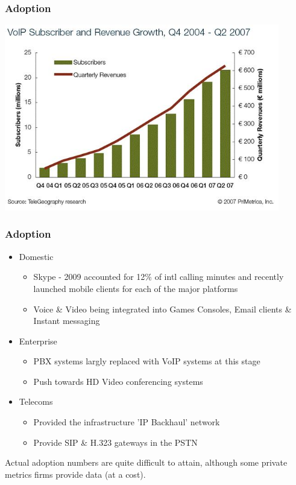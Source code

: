 \begin{frame}
\frametitle{Adoption}
	\begin{center} 
  		\includegraphics[width=0.9\textwidth]{22-02-2008_4.jpg} 
	\end{center} 
\end{frame}



\begin{frame}
\frametitle{Adoption}

	\begin{itemize}

	\item Domestic
		\begin{itemize}
			\item Skype - 2009 accounted for 12\% of intl calling minutes and recently launched mobile clients for each of the major platforms
			\item Voice \& Video being integrated into Games Consoles, Email clients \& Instant messaging
		\end{itemize}
	\pause
	\item Enterprise
		\begin{itemize}
			\item PBX systems largly replaced with VoIP systems at this stage
			\item Push towards HD Video conferencing systems
		\end{itemize}
	\pause
	\item Telecoms
		\begin{itemize}

			\item Provided the infrastructure 'IP Backhaul' network
			\item Provide SIP \& H.323 gateways in the PSTN
		\end{itemize}

	\end{itemize}
	\pause
	Actual adoption numbers are quite difficult to attain, although some private metrics firms provide data (at a cost).

\end{frame}


